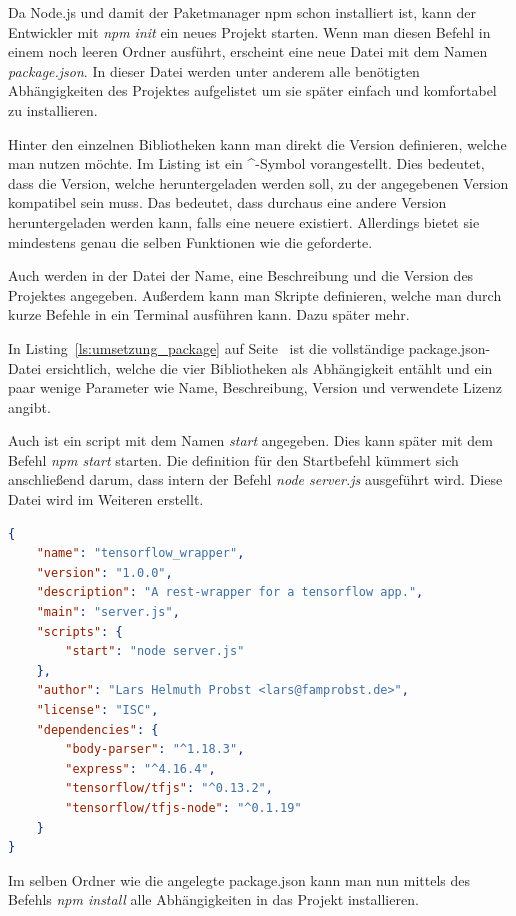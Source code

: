 Da Node.js und damit der Paketmanager npm schon installiert ist, kann der Entwickler mit \textit{npm init} ein neues 
Projekt starten. Wenn man diesen Befehl in einem noch leeren Ordner ausführt, erscheint eine neue Datei mit dem Namen
\textit{package.json}. In dieser Datei werden unter anderem alle benötigten Abhängigkeiten des Projektes aufgelistet 
um sie später einfach und komfortabel zu installieren.

Hinter den einzelnen Bibliotheken kann man direkt die Version definieren, welche man nutzen möchte. Im Listing ist ein
\textbf{\^}-Symbol vorangestellt. Dies bedeutet, dass die Version, welche heruntergeladen werden soll, zu der angegebenen
Version kompatibel sein muss. Das bedeutet, dass durchaus eine andere Version heruntergeladen werden kann, falls eine
neuere existiert. Allerdings bietet sie mindestens genau die selben Funktionen wie die geforderte.

Auch werden in der Datei der Name, eine Beschreibung und die Version des Projektes angegeben. Außerdem kann man Skripte
definieren, welche man durch kurze Befehle in ein Terminal ausführen kann. Dazu später mehr.

In Listing~\ref{ls:umsetzung_package} auf Seite~\pageref{ls:umsetzung_package} ist die vollständige package.json-Datei
ersichtlich, welche die vier Bibliotheken als Abhängigkeit entählt und ein paar wenige Parameter wie Name, Beschreibung,
Version und verwendete Lizenz angibt. 

Auch ist ein script mit dem Namen \textit{start} angegeben. Dies kann später mit dem Befehl \textit{npm start} starten.
Die definition für den Startbefehl kümmert sich anschließend darum, dass intern der Befehl \textit{node server.js}
ausgeführt wird. Diese Datei wird im Weiteren erstellt.

\begin{lstlisting}[language=json, caption=Die komplette package.json, label=ls:umsetzung_package]
{
    "name": "tensorflow_wrapper",
    "version": "1.0.0",
    "description": "A rest-wrapper for a tensorflow app.",
    "main": "server.js",
    "scripts": {
        "start": "node server.js"
    },
    "author": "Lars Helmuth Probst <lars@famprobst.de>",
    "license": "ISC",
    "dependencies": {
        "body-parser": "^1.18.3",
        "express": "^4.16.4",
        "tensorflow/tfjs": "^0.13.2",
        "tensorflow/tfjs-node": "^0.1.19"
    }
}
\end{lstlisting}

Im selben Ordner wie die angelegte package.json kann man nun mittels des Befehls \textit{npm install} alle Abhängigkeiten 
in das Projekt installieren. 

